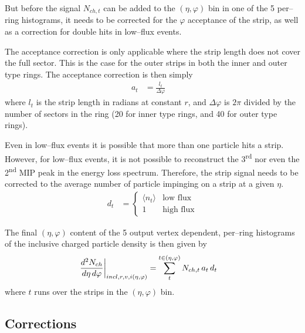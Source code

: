 \documentclass[11pt]{article}
\newcommand{\dndetadphi}[1][]{{\ensuremath%
    \ifx|#1|\else\left.\fi%
    \frac{d^2N_{ch}}{d\eta\,d\varphi}%
    \ifx|#1|\else\right|_{#1}\fi%
}}
\begin{document}
But before the signal $N_{ch,t}$ can be added to the $(\eta,\varphi)$
bin in one of the 5 per--ring histograms, it needs to be corrected for
the $\varphi$ acceptance of the strip, as well as a correction for
double hits in low--flux events.   

The acceptance correction is only applicable where the strip length
does not cover the full sector.  This is the case for the outer strips
in both the inner and outer type rings.  The acceptance correction is
then simply 
\begin{align}
  \label{eq:acc_corr}
  a_t &= \frac{l_t}{\Delta\varphi}\quad
\end{align}
where $l_t$ is the strip length in radians at constant $r$, and
$\Delta\varphi$ is $2\pi$ divided by the number of sectors in the
ring (20 for inner type rings, and 40 for outer type rings). 

Even in low--flux events it is possible that more than one particle
hits a strip.  However, for low--flux events, it is not possible to
reconstruct the 3\textsuperscript{rd} nor even the
2\textsuperscript{nd} MIP peak in the energy loss spectrum.
Therefore, the strip signal needs to be corrected to the average
number of particle impinging on a strip at a given $\eta$.  
\begin{align}
  d_t &= \left\{\begin{array}{cl} \langle n_t\rangle & \text{low
        flux}\\
      1 & \text{high flux}
    \end{array}\right.
\end{align}

The final $(\eta,\varphi)$ content of the 5 output vertex dependent,
per--ring histograms of the inclusive charged particle density is then
given by
\begin{align}
  \dndetadphi[incl,r,v,i(\eta,\varphi)] &= \sum_t^{t\in(\eta,\varphi)}
  N_{ch,t}\,a_t\,d_t
\end{align}
where $t$ runs over the strips in the $(\eta,\varphi)$ bin. 

\subsection*{Corrections}
\end{document}
